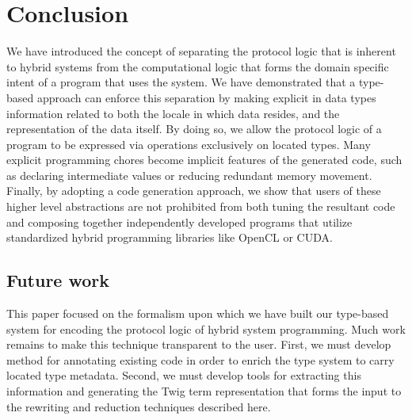
\section{Conclusion}

We have introduced the concept of separating the protocol logic that is inherent
to hybrid systems from the computational logic that forms the domain specific
intent of a program that uses the system. We have demonstrated that a type-based
approach can enforce this separation by making explicit in data types
information related to both the locale in which data resides, and the
representation of the data itself. By doing so, we allow the protocol logic of a
program to be expressed via operations exclusively on located types. Many
explicit programming chores become implicit features of the generated code, such
as declaring intermediate values or reducing redundant memory movement. Finally,
by adopting a code generation approach, we show that users of these higher level
abstractions are not prohibited from both tuning the resultant code and
composing together independently developed programs that utilize standardized
hybrid programming libraries like OpenCL or CUDA.

\subsection{Future work}

This paper focused on the formalism upon which we have built our type-based
system for encoding the protocol logic of hybrid system programming. Much work
remains to make this technique transparent to the user. First, we must develop
method for annotating existing code in order to enrich the type system to carry
located type metadata. Second, we must develop tools for extracting this
information and generating the Twig term representation that forms the input to
the rewriting and reduction techniques described here.

